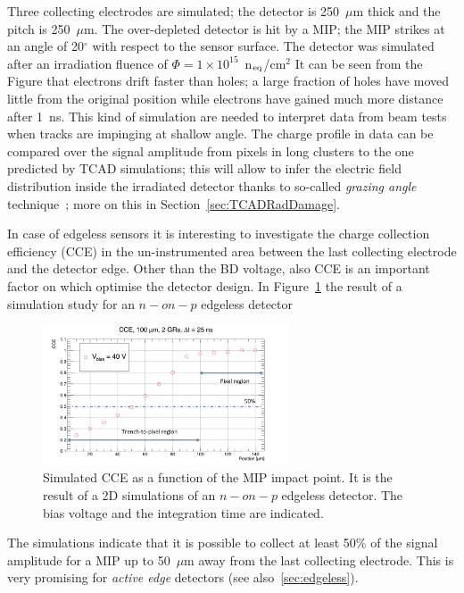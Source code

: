 Three collecting electrodes are simulated; the detector is 250~$\mu$m thick and the pitch 
is 250~$\mu$m. The over-depleted detector is hit by a MIP; the MIP strikes at 
an angle of 20$^{\circ}$ with respect to the sensor surface. The detector was simulated after 
an irradiation fluence of $\Phi=1\times10^{15}$~n$_{\rm eq}$/cm$^2$
It can be seen from the Figure that electrons drift faster than holes; a large fraction of holes 
have moved little from the original position while electrons have gained much more distance 
after 1~ns. 
This kind of simulation are needed to interpret data from  beam tests when tracks are impinging 
at shallow angle. The charge profile in data can be compared over the signal amplitude from pixels in 
long clusters to the one predicted by TCAD simulations; this will allow to infer the electric field 
distribution inside the irradiated detector thanks to so-called {\it grazing angle} 
technique~\cite{Henrich:687041,Lari:2001qqa,LARI2004349}; more 
on this in Section~\ref{sec:TCADRadDamage}.

In case of edgeless sensors it is interesting to investigate the charge collection efficiency (CCE) 
in the un-instrumented area between the last collecting electrode and the detector edge. 
Other than the BD voltage, also CCE is an important factor on which optimise the 
detector design. In Figure~\ref{fig:Edgeless_CCE} the result of a simulation study for an 
$n-on-p$ edgeless detector 
\begin{figure}[!htbp]
\centering
\includegraphics[width=0.65\textwidth]{Edgeless_CCE.png}
\caption{\label{fig:Edgeless_CCE}Simulated CCE as a function of the MIP impact point. 
It is the result of a 2D simulations of an $n-on-p$ edgeless detector. The bias voltage and the integration time 
are indicated.}
\end{figure}

The simulations indicate that it is possible to collect at least 50\% of the signal amplitude for a MIP 
up to 50~$\mu$m away from the last collecting electrode. This is very promising for {\it active edge} 
detectors  (see also~\ref{sec:edgeless}).

